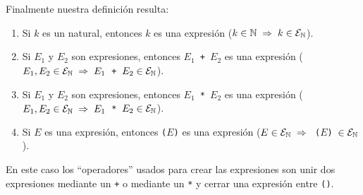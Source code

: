 \begin{ejemplo}
	Finalmente nuestra definición resulta:
	\begin{enumerate}
	\itemsep 0pt
	\item Si $k$ es un natural, entonces $k$ es una expresión ($k\in\mathbb{N}\;\Rightarrow\;k\in\mathcal{E}_{\mathbb{N}}$).
	\item	Si $E_1$ y $E_2$ son expresiones, entonces \texttt{$E_1$ + $E_2$} es una expresión (\texttt{$E_1,E_2\in\mathcal{E}_{\mathbb{N}}\;\Rightarrow\;E_1$ + $E_2\in\mathcal{E}_{\mathbb{N}}$}).
	\item	Si $E_1$ y $E_2$ son expresiones, entonces \texttt{$E_1$ * $E_2$} es una expresión (\texttt{$E_1,E_2\in\mathcal{E}_{\mathbb{N}}\;\Rightarrow\;E_1$ * $E_2\in\mathcal{E}_{\mathbb{N}}$}).
	\item	Si $E$ es una expresión, entonces \texttt{($E$)} es una expresión (\texttt{$E\in\mathcal{E}_{\mathbb{N}}\;\Rightarrow\;$ ($E$) $\in\mathcal{E}_{\mathbb{N}}$}).
	\end{enumerate}
	
	En este caso los ``operadores'' usados para crear las expresiones son unir dos expresiones mediante un \texttt{+} o mediante un \texttt{*} y cerrar una expresión entre \texttt{()}.
	\end{ejemplo}
	

